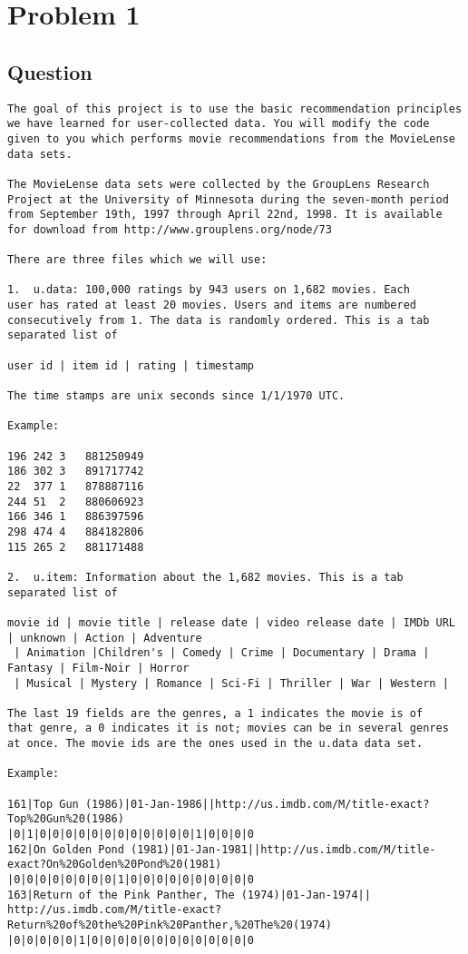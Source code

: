 \section{Problem 1}
\label{part1}
\subsection*{Question}
\begingroup
\begin{verbatim}
The goal of this project is to use the basic recommendation principles
we have learned for user-collected data. You will modify the code
given to you which performs movie recommendations from the MovieLense
data sets.

The MovieLense data sets were collected by the GroupLens Research
Project at the University of Minnesota during the seven-month period
from September 19th, 1997 through April 22nd, 1998. It is available
for download from http://www.grouplens.org/node/73

There are three files which we will use:

1.  u.data: 100,000 ratings by 943 users on 1,682 movies. Each
user has rated at least 20 movies. Users and items are numbered
consecutively from 1. The data is randomly ordered. This is a tab
separated list of 

user id | item id | rating | timestamp

The time stamps are unix seconds since 1/1/1970 UTC.

Example:

196	242	3	881250949
186	302	3 	891717742
22	377	1 	878887116
244	51	2 	880606923
166	346	1 	886397596
298	474	4 	884182806
115	265	2	881171488

2.  u.item: Information about the 1,682 movies. This is a tab
separated list of

movie id | movie title | release date | video release date | IMDb URL | unknown | Action | Adventure
 | Animation |Children's | Comedy | Crime | Documentary | Drama | Fantasy | Film-Noir | Horror
 | Musical | Mystery | Romance | Sci-Fi | Thriller | War | Western |

The last 19 fields are the genres, a 1 indicates the movie is of
that genre, a 0 indicates it is not; movies can be in several genres
at once. The movie ids are the ones used in the u.data data set.

Example:

161|Top Gun (1986)|01-Jan-1986||http://us.imdb.com/M/title-exact?Top%20Gun%20(1986)
|0|1|0|0|0|0|0|0|0|0|0|0|0|0|1|0|0|0|0 
162|On Golden Pond (1981)|01-Jan-1981||http://us.imdb.com/M/title-exact?On%20Golden%20Pond%20(1981)
|0|0|0|0|0|0|0|0|1|0|0|0|0|0|0|0|0|0|0 
163|Return of the Pink Panther, The (1974)|01-Jan-1974||
http://us.imdb.com/M/title-exact?Return%20of%20the%20Pink%20Panther,%20The%20(1974)
|0|0|0|0|0|1|0|0|0|0|0|0|0|0|0|0|0|0|0


\end{verbatim}
